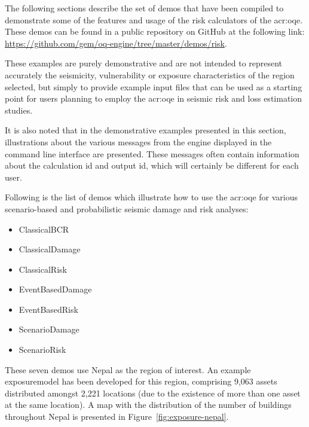 The following sections describe the set of demos that have been compiled to
demonstrate some of the features and usage of the risk calculators of the
\glsdesc{acr:oqe}. These demos can be found in a public repository on GitHub at
the following link:
\href{https://github.com/gem/oq-engine/tree/master/demos/risk}
{https://github.com/gem/oq-engine/tree/master/demos/risk}.

These examples are purely demonstrative and are not intended to represent
accurately the seismicity, vulnerability or exposure characteristics of the
region selected, but simply to provide example input files that can be used
as a starting point for users planning to employ the \glsdesc{acr:oqe} in seismic
risk and loss estimation studies.

It is also noted that in the demonstrative examples presented in this section,
illustrations about the various messages from the engine displayed in the
command line interface are presented. These messages often contain information
about the calculation id and output id, which will certainly be different for
each user.

Following is the list of demos which illustrate how to use the \gls{acr:oqe} for
various scenario-based and probabilistic seismic damage and risk analyses:

\begin{itemize}

    \item ClassicalBCR
	\item ClassicalDamage
    \item ClassicalRisk
    \item EventBasedDamage
    \item EventBasedRisk
    \item ScenarioDamage
    \item ScenarioRisk

\end{itemize}

These seven demos use Nepal as the region of interest. An example
\gls{exposuremodel} has been developed for this region, comprising 9,063
assets distributed amongst 2,221 locations (due to the existence of more than
one \gls{asset} at the same location). A map with the distribution of the
number of buildings throughout Nepal is presented in Figure~\ref{fig:exposure-nepal}.

